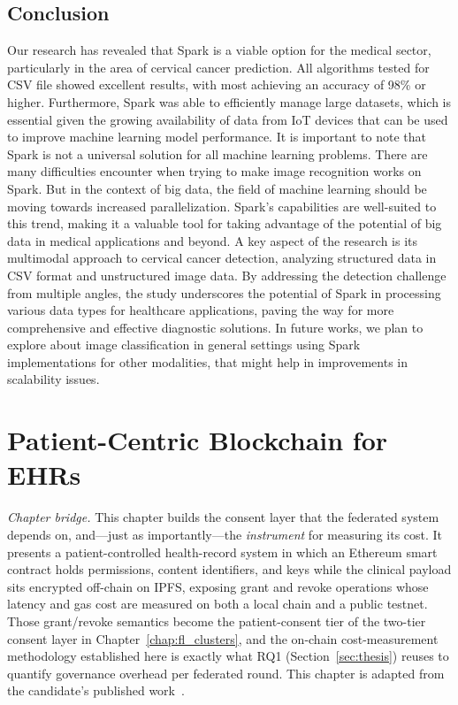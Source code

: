 \documentclass[12pt]{report}
\begin{document}
\section{Conclusion}
Our research has revealed that Spark is a viable option for the medical sector, particularly in the area of cervical cancer prediction. All algorithms tested for CSV file showed excellent results, with most achieving an accuracy of 98\% or higher. Furthermore, Spark was able to efficiently manage large datasets, which is essential given the growing availability of data from IoT devices that can be used to improve machine learning model performance. It is important to note that Spark is not a universal solution for all machine learning problems. There are many difficulties encounter when trying to make image recognition works on Spark. But in the context of big data, the field of machine learning should be moving towards increased parallelization. Spark's capabilities are well-suited to this trend, making it a valuable tool for taking advantage of the potential of big data in medical applications and beyond. A key aspect of the research is its multimodal approach to cervical cancer detection, analyzing structured data in CSV format and unstructured image data. By addressing the detection challenge from multiple angles, the study underscores the potential of Spark in processing various data types for healthcare applications, paving the way for more comprehensive and effective diagnostic solutions.
In future works, we plan to explore about image classification in general settings using Spark implementations for other modalities, that might help in improvements in scalability issues.

\chapter{Patient-Centric Blockchain for EHRs}\label{chap:blockchain}

\noindent\emph{Chapter bridge.} This chapter builds the consent layer that the
federated system depends on, and---just as importantly---the \emph{instrument} for
measuring its cost. It presents a patient-controlled health-record system in which
an Ethereum smart contract holds permissions, content identifiers, and keys while
the clinical payload sits encrypted off-chain on IPFS, exposing grant and revoke
operations whose latency and gas cost are measured on both a local chain and a
public testnet. Those grant/revoke semantics become the patient-consent tier of
the two-tier consent layer in Chapter~\ref{chap:fl_clusters}, and the on-chain
cost-measurement methodology established here is exactly what RQ1
(Section~\ref{sec:thesis}) reuses to quantify governance overhead per federated
round. This chapter is adapted from the candidate's published work~\cite{nhan2024ehr}.
\end{document}
